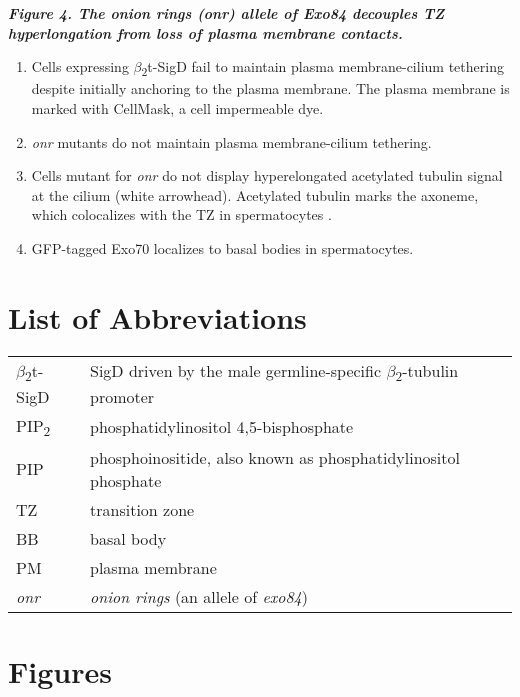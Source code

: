 \documentclass[12pt, twoside, letterpaper]{article}
\newcommand{\PIP}{PIP\textsubscript{2}}
\newcommand{\sigd}{$\beta$\textsubscript{2}t-SigD}
\begin{document}
\begin{doublespacing}
\begin{linenumbers}
    \bigskip
    \textbf{\itshape Figure 4. The \textit{onion rings} (\textit{onr}) allele of Exo84 decouples TZ hyperlongation from loss of plasma membrane contacts.}
    \begin{enumerate}[label={(\Alph*)}, nolistsep]
    \item Cells expressing \sigd{} fail to maintain plasma membrane-cilium tethering despite initially anchoring to the plasma membrane.
      The plasma membrane is marked with CellMask, a cell impermeable dye.
    \item \textit{onr} mutants do not maintain plasma membrane-cilium tethering.
    \item Cells mutant for \textit{onr} do not display hyperelongated acetylated tubulin signal at the cilium (white arrowhead).
      Acetylated tubulin marks the axoneme, which colocalizes with the TZ in spermatocytes \citep{pratt2016drosophila}.
    \item GFP-tagged Exo70 localizes to basal bodies in spermatocytes.
    \end{enumerate}
    
  \end{linenumbers}


    \section*{List of Abbreviations}
    \begin{tabular}{ll}
       \sigd{} & SigD driven by the male germline-specific $\beta$\textsubscript{2}-tubulin promoter \\
       \PIP{} & phosphatidylinositol 4,5-bisphosphate \\
      PIP & phosphoinositide, also known as phosphatidylinositol phosphate \\
       TZ & transition zone \\
       BB & basal body \\
       PM & plasma membrane \\ 
       \textit{onr} & \textit{onion rings} (an allele of \textit{exo84})
    \end{tabular}
\end{doublespacing}

%
\printbibliography

\newpage

\section*{Figures}
\end{document}
